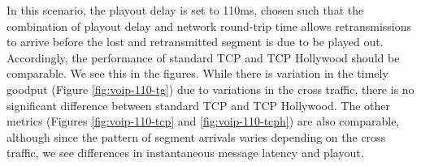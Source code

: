 In this scenario, the playout delay is set to 110ms, chosen such that the
combination of playout delay and network round-trip time allows
retransmissions to arrive before the lost and retransmitted segment is 
due to be played out. Accordingly, the performance of standard TCP and 
TCP Hollywood should be comparable. We see this in the figures. While
there is variation in the timely goodput (Figure \ref{fig:voip-110-tg}) 
due to variations in the cross traffic, there is no significant difference
between standard TCP and TCP Hollywood. The other metrics (Figures 
\ref{fig:voip-110-tcp} and \ref{fig:voip-110-tcph}) are also comparable,
although since the pattern of segment arrivals varies depending on the
cross traffic, we see differences in instantaneous message latency and
playout.


\begin{figure*}[t!]
\captionsetup[subfigure]{labelformat=empty}
\end{figure*}
